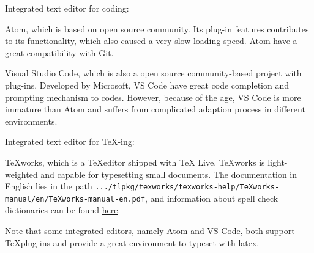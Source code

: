 \documentclass[english]{../TeXTemplate/pkupaper}
\begin{document}
Integrated text editor for coding:
\begin{partlist}
\item Atom, which is based on open source community. Its plug-in features contributes to its functionality, which also caused a very slow loading speed. Atom have a great compatibility with Git.
\item Visual Studio Code, which is also a open source community-based project with plug-ins. Developed by Microsoft, VS Code have great code completion and prompting mechanism to codes. However, because of the age, VS Code is more immature than Atom and suffers from complicated adaption process in different environments.
\end{partlist}

Integrated text editor for \TeX-ing:
\begin{partlist}
\item TeXworks, which is a \TeX editor shipped with TeX Live. TeXworks is light-weighted and capable for typesetting small documents. The documentation in English lies in the path \verb".../tlpkg/texworks/texworks-help/TeXworks-manual/en/TeXworks-manual-en.pdf", and information about spell check dictionaries can be found \href{https://github.com/TeXworks/texworks/wiki/SpellingDictionaries}{here}.
\end{partlist}
Note that some integrated editors, namely Atom and VS Code, both support \TeX plug-ins and provide a great environment to typeset with latex.
\end{document}
